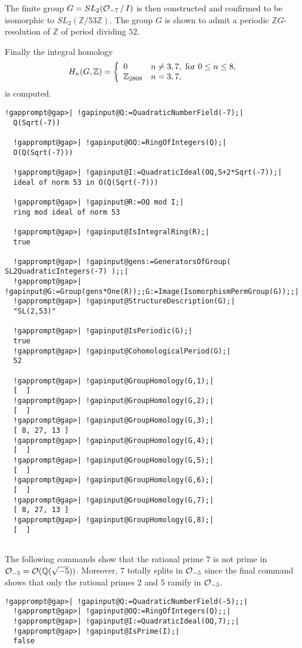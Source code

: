 \documentclass[a4paper,11pt]{report}
\begin{document}
{{The finite group $G=SL_2({\cal O}_{-7}\,/\,I)$ is then constructed and confirmed to be isomorphic to $SL_2(\mathbb Z/53\mathbb Z)$. The group $G$ is shown to admit a periodic $\mathbb ZG$-resolution of $\mathbb Z$ of period dividing $52$. 

Finally the integral homology 
\[H_n(G,\mathbb Z) = \left\{\begin{array}{ll} 0 & n\ne 3,7, {\rm~for~} 0\le n
\le 8,\\ \mathbb Z_{2808} & n=3,7, \end{array}\right.\]
 is computed. 
\begin{Verbatim}[commandchars=!@|,fontsize=\small,frame=single,label=Example]
  !gapprompt@gap>| !gapinput@Q:=QuadraticNumberField(-7);|
  Q(Sqrt(-7))
  
  !gapprompt@gap>| !gapinput@OQ:=RingOfIntegers(Q);|
  O(Q(Sqrt(-7)))
  
  !gapprompt@gap>| !gapinput@I:=QuadraticIdeal(OQ,5+2*Sqrt(-7));|
  ideal of norm 53 in O(Q(Sqrt(-7)))
  
  !gapprompt@gap>| !gapinput@R:=OQ mod I;|
  ring mod ideal of norm 53
  
  !gapprompt@gap>| !gapinput@IsIntegralRing(R);|
  true
  
  !gapprompt@gap>| !gapinput@gens:=GeneratorsOfGroup( SL2QuadraticIntegers(-7) );;|
  !gapprompt@gap>| !gapinput@G:=Group(gens*One(R));;G:=Image(IsomorphismPermGroup(G));;|
  !gapprompt@gap>| !gapinput@StructureDescription(G);|
  "SL(2,53)"
  
  !gapprompt@gap>| !gapinput@IsPeriodic(G);|
  true
  !gapprompt@gap>| !gapinput@CohomologicalPeriod(G);|
  52
  
  !gapprompt@gap>| !gapinput@GroupHomology(G,1);|
  [  ]
  !gapprompt@gap>| !gapinput@GroupHomology(G,2);|
  [  ]
  !gapprompt@gap>| !gapinput@GroupHomology(G,3);|
  [ 8, 27, 13 ]
  !gapprompt@gap>| !gapinput@GroupHomology(G,4);|
  [  ]
  !gapprompt@gap>| !gapinput@GroupHomology(G,5);|
  [  ]
  !gapprompt@gap>| !gapinput@GroupHomology(G,6);|
  [  ]
  !gapprompt@gap>| !gapinput@GroupHomology(G,7);|
  [ 8, 27, 13 ]
  !gapprompt@gap>| !gapinput@GroupHomology(G,8);|
  [  ]
  
\end{Verbatim}
 

The following commands show that the rational prime $7$ is not prime in ${\cal O}_{-5}={\cal O}(\mathbb Q(\sqrt{-5}))$. Moreover, $7$ totally splits in ${\cal O}_{-5}$ since the final command shows that only the rational primes $2$ and $5$ ramify in ${\cal O}_{-5}$. 
\begin{Verbatim}[commandchars=!@|,fontsize=\small,frame=single,label=Example]
  !gapprompt@gap>| !gapinput@Q:=QuadraticNumberField(-5);;|
  !gapprompt@gap>| !gapinput@OQ:=RingOfIntegers(Q);;|
  !gapprompt@gap>| !gapinput@I:=QuadraticIdeal(OQ,7);;|
  !gapprompt@gap>| !gapinput@IsPrime(I);|
  false
  

\end{Verbatim}}}
\end{document}
